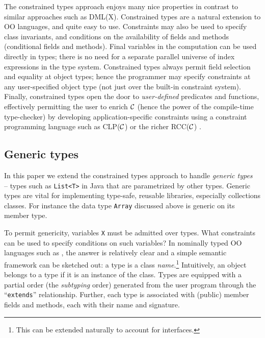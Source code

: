 The constrained types approach enjoys many nice properties in contrast
to similar approaches such as DML(X)\cite{xi99dependent}.  Constrained
types are a natural extension to OO languages, and quite easy to
use. Constraints may also be used to specify class invariants, and
conditions on the availability of fields and methods (conditional
fields and methods).  Final variables in the computation can be used
directly in types; there is no need for a separate parallel universe
of index expressions in the type system.  Constrained types always
permit field selection and equality at object types; hence the
programmer may specify constraints at any user-specified object type
(not just over the built-in constraint system).  Finally, constrained
types open the door to {\em user-defined} predicates and functions,
effectively permitting the user to enrich $\cal C$ (hence the power of
the compile-time type-checker) by developing application-specific
constraints using a constraint programming language such as CLP($\cal
C$) \cite{clp} or the richer RCC($\cal C$) \cite{DBLP:conf/fsttcs/JagadeesanNS05}.

\subsection{Generic types}

In this paper we extend the constrained types approach to handle {\em
generic
types}~\cite{clu,ada,GJ,java-popl97,thorup97,Java3,csharp-generics} --
types such as {\tt List<T>} in Java that are parametrized by other
types. Generic types are vital for implementing type-safe, reusable
libraries, especially collections classes. For instance the data type
{\tt Array} discussed above is generic on its member type.

To permit genericity, variables {\tt X} must be admitted over types.
What constraints can be used to specify conditions on such variables?
In nominally typed OO languages such as \Java, the answer is
relatively clear and a simple semantic framework can be sketched out:
a type is a class {\em name}.\footnote{This can be extended naturally
to account for interfaces.} Intuitively, an object belongs to a type
if it is an instance of the class. Types are equipped with a partial
order (the {\em subtyping} order) generated from the user program
through the ``{\tt extends}'' relationship.  Further, each type is
associated with (public) member fields and methods, each with their
name and signature.
%

